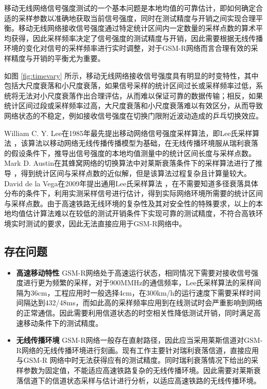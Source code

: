 移动无线网络信号强度测试的一个基本问题是本地均值的可靠估计，即如何确定合适的采样参数以准确地获取当前信号强度，同时在测试精度与开销之间实现合理平衡。移动无线网络接收信号强度通过特定统计区间内一定数量的采样点数的算术平均获得，因此采样频率决定了信号强度的测试精度与开销，因此需要根据无线传播环境的变化对信号的采样频率进行实时调整，对于GSM-R网络而言合理有效的采样精度与开销的平衡尤为重要。

如图 \ref{fig:timevary} 所示，移动无线网络接收信号强度具有明显的时变特性，其中包括大尺度衰落和小尺度衰落，如果信号采样的统计区间过长或采样频率过低，系统将无法对小尺度衰落作出合理评估，从而难以保证可靠的数据传输；相反，如果统计区间过段或采样频率过高，大尺度衰落和小尺度衰落难以有效区分，从而导致网络状态的不稳定，例如接收信号强度在切换门限附近波动造成的乒乓切换效应。

William C. Y. Lee在1985年最先提出移动网络信号强度采样算法，即Lee氏采样算法 ，该算法以移动网络无线传播传播模型为基础，在无线传播环境服从瑞利衰落的假设条件下，推导出信号强度的本地均值测量中的统计区间长度与采样点数。Mark D. Austin在其蜂窝网络的切换算法中对莱斯衰落条件下的采样算法进行了推导 ，得到统计区间与采样点数的近似解，但是该算法过程复杂且计算量较大。David de la Vega在2009年提出通用Lee氏采样算法 ，在不需要知道多径衰落具体分布的条件下，利用实测采样信号进行估计，得到实际网络环境所需要的统计区间与采样点数。由于高速铁路无线环境的复杂性及其对安全性的特殊要求，以上的本地均值估计算法难以在较低的测试开销条件下实现可靠的测试精度，不符合高铁环境实时测试的要求，因此无法直接应用于GSM-R网络中。

\subsection{存在问题}
\label{sec:prob3}

\begin{itemize}
  \item \textbf{高速移动特性}
  GSM-R网络处于高速运行状态，相同情况下需要对接收信号强度进行更为频繁的采样，对于900MMHz的通信频率，Lee氏采样算法的采样间隔为36cm，工程应用时一般选择4cm，在300km/h的运行速度下需要采样时间间隔达到432/48ms，而如此高的采样频率应用到在线测试时会严重影响到网络的正常通信。因此需要利用信道状态的时空相关性降低测试开销，同时满足高速移动条件下的测试精度。
  \item \textbf{无线传播环境}
  GSM-R网络一般存在直射路径，因此应当采用莱斯信道对GSM-R网络的无线传播环境进行刻画。现有工作主要针对瑞利衰落信道，直接应用与GSM-R 网络中时无法获得应有的测试精度。同时瑞利衰落情况下给出的采样参数为固定值，不能适应高速铁路复杂的无线传播环境。因此需要对莱斯衰落信道下的信道状态采样与估计进行分析，以适应高速铁路的无线传播环境。
\end{itemize}

